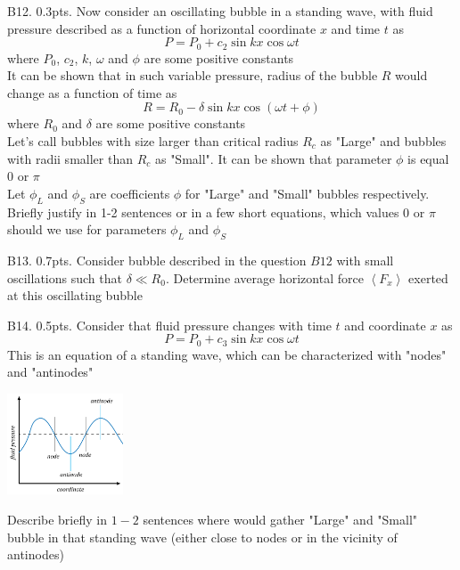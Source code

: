 \begin{subpr}{B12. \hfill 0.3pts.} Now consider an oscillating bubble in a standing wave, with fluid pressure described as a function of horizontal coordinate ${x}$ and time ${t}$ as
$$P = P_0 + c_2\sin kx\cos\omega t$$
where ${P_0}$, ${c_2}$, ${k}$, ${\omega}$ and ${\phi}$ are some positive constants\\
It can be shown that in such variable pressure, radius of the bubble ${R}$ would change as a function of time as 
$$R = R_0 - \delta \sin kx\cos(\omega t +\phi)$$
where ${R_0}$ and ${\delta}$ are some positive constants\\
Let's call bubbles with size larger than critical radius  ${R_c}$ as "Large" and bubbles with radii smaller than ${R_c}$ as "Small". It can be shown that parameter ${\phi}$ is equal ${0}$ or ${\pi}$\\
Let ${\phi_L}$ and ${\phi_S}$ are coefficients ${\phi}$ for "Large" and "Small" bubbles respectively. Briefly justify in 1-2 sentences or in a few short equations, which values ${0}$ or ${\pi}$ should we use for parameters ${\phi_L}$ and ${\phi_S}$
\end{subpr}
\begin{subpr}{B13. \hfill 0.7pts.} 
Consider bubble described in the question ${B12}$ with small oscillations such that ${\delta \ll R_0}$. Determine average horizontal force ${\left<F_x\right>}$ exerted at this oscillating bubble
\end{subpr}
\begin{subpr}{B14. \hfill 0.5pts.}
Consider that fluid pressure changes with time ${t}$ and coordinate ${x}$ as
$$	P = P_0 + c_3\sin kx\cos\omega t$$
This is an equation of a standing wave, which can be characterized with "nodes" and "antinodes"
\begin{center}
\includegraphics[height=3cm]{Images/22_bbl_prob_nodes_antinodes_grouping1.PNG}
\end{center}
Describe briefly in ${1-2}$ sentences where would gather "Large" and "Small" bubble in that standing wave (either close to nodes or in the vicinity of antinodes)	
\end{subpr}

\clearpage